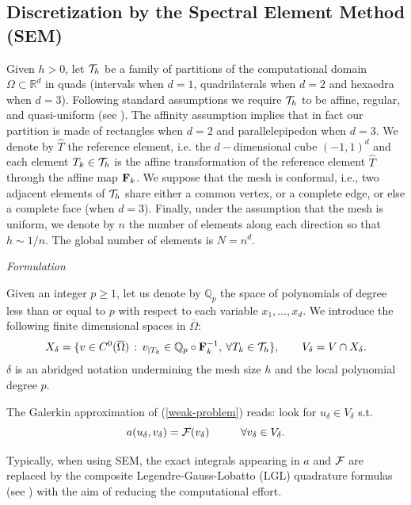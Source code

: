 \documentclass[11pt]{article}
\begin{document}
\subsection{Discretization by the Spectral Element Method (SEM)}

Given $h>0$, let ${\cal T}_h$ be a family of 
partitions of the computational domain
$\Omega\subset {\mathbb R}^d$ in 
quads (intervals when $d=1$, 
quadrilaterals when $d=2$ and hexaedra when $d=3$).
Following standard  assumptions we require ${\cal T}_h$
to be affine, regular, and quasi-uniform
(see \cite[Ch. 3]{qvb}). The affinity assumption implies that in fact
our partition is made of rectangles when $d=2$ and parallelepipedon when $d=3$.
We denote by $\hat T$ the reference element, i.e. the 
 $d-$dimensional cube $(-1,1)^d$ and
each element $T_k\in {\cal T}_h$ is the affine transformation of 
the reference element $\hat T$  through the affine map
${\bf F}_k$.
We suppose that the mesh is conformal, i.e., 
two adjacent elements of ${\cal T}_h$ share
either a common vertex,
 or a complete edge, or else a complete face (when $d=3$).
Finally,  
 under the assumption
that the mesh is uniform, we denote by $n$ the number of elements along 
each direction so that $h\sim 1/n$. The global number of elements is $N=n^d$.

\null
\emph{Formulation}


Given an integer $p\geq 1$, let us denote by
${\mathbb Q}_p$ the space of polynomials
of degree less than or equal to $p$ with respect to each variable
$x_1,\ldots, x_d$. 
We introduce the following finite dimensional spaces in $\overline \Omega$:
\begin{equation}\label{space_SEM}
  X_\delta = \{ v \in C^0(\overline{\Omega}) \, : \, v_{|T_k}
\in {\mathbb Q}_{p}\circ{\bf F}_k^{-1}, \: \forall T_k \in {\cal T}_h \},
\qquad V_\delta=V\cap X_\delta.
\end{equation}
$\delta$ is an abridged notation undermining 
 the mesh size $h$ 
 and the local polynomial degree $p$.


The Galerkin approximation of (\ref{weak-problem}) reads:
look for $u_\delta\in V_\delta$
s.t.
\begin{equation}\label{h-weak-problem}
a(u_\delta,v_\delta)={\cal F}(v_\delta)  \hskip 1.cm
\forall v_\delta\in V_\delta.
\end{equation}

Typically, when using  SEM, the exact integrals appearing in $a$ and ${\cal F}$
are replaced by the composite Legendre-Gauss-Lobatto (LGL) quadrature formulas
(see \cite{chqz06}) with the aim of reducing the computational effort.
\end{document}
